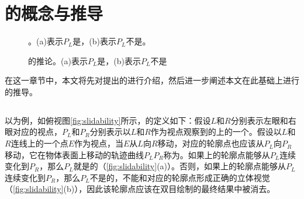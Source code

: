 \chapter{\epsl{}的概念与推导}

\begin{figure}[tbh]
    \centering
    \hfil
    \caption{\epsl{}。(a)表示$P_L$是\epslb{}，(b)表示$P_L$不是\epslb{}。} \label{fig_sim2}
    \label{fig:slidability}
\end{figure}

\begin{figure}[tbh]
    \centering
    \hfil
    \caption{\epsl{}的推论。(a)表示$P_L$是\epslb{}，(b)表示$P_L$不是\epslb{}} \label{fig:inverse_slidability}
\end{figure}

在这一章节中，本文将先对\citeauthor{kim2013stereoscopic}提出的\epsl{}\cite{kim2013stereoscopic}进行介绍，然后进一步阐述本文在此基础上进行的推导。

\section{\epsl{}}

以\con{}为例，如俯视图\autoref{fig:slidability}所示，\epsl{}的定义如下：假设$L$和$R$分别表示左眼和右眼对应的视点，$P_L$和$P_R$分别表示以$L$和$R$作为视点观察到的\con{}上的一个\conp{}。假设以$L$和$R$连线上的一个点$E$作为视点，当$E$从$L$向$R$移动，对应的轮廓点也应该从$P_L$向$P_R$移动，它在物体表面上移动的轨迹曲线${P_L}{P_R}$称为\ec{}\cite{geiger1995occlusions}。如果\ec{}上的轮廓点能够从$P_L$连续变化到$P_R$，那么$P_L$就是\epslb{}的（\autoref{fig:slidability}(a)）。否则，如果\ec{}上的轮廓点能够从$P_L$连续变化到$P_R$，那么$P_L$不是\epslb{}的，不能和对应的轮廓点形成正确的立体视觉（\autoref{fig:slidability}(b)），因此该轮廓点应该在双目绘制的最终结果中被消去。
 
